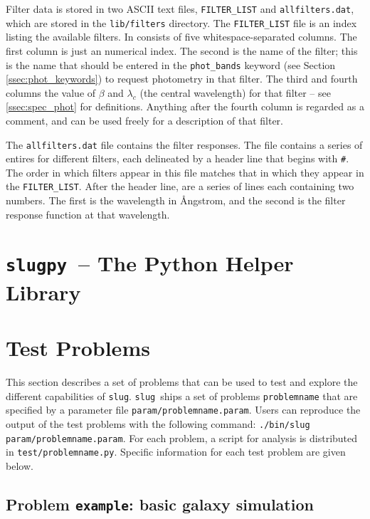 \documentclass[12pt]{article}
\newcommand{\slug}{\texttt{slug}}
\newcommand{\slugpy}{\texttt{slugpy}}
\begin{document}
Filter data is stored in two ASCII text files, \verb=FILTER_LIST= and \verb=allfilters.dat=, which are stored in the \verb=lib/filters= directory. The \verb=FILTER_LIST= file is an index listing the available filters. In consists of five whitespace-separated columns. The first column is just an numerical index. The second is the name of the filter; this is the name that should be entered in the \verb=phot_bands= keyword (see Section \ref{ssec:phot_keywords}) to request photometry in that filter. The third and fourth columns the value of $\beta$ and $\lambda_c$ (the central wavelength) for that filter -- see \ref{ssec:spec_phot} for definitions. Anything after the fourth column is regarded as a comment, and can be used freely for a description of that filter.

The \verb=allfilters.dat= file contains the filter responses. The file contains a series of entires for different filters, each delineated by a header line that begins with \verb=#=. The order in which filters appear in this file matches that in which they appear in the \verb=FILTER_LIST=. After the header line, are a series of lines each containing two numbers. The first is the wavelength in {\AA}ngstrom, and the second is the filter response function at that wavelength.

\section{\slugpy\ -- The Python Helper Library}



\section{Test Problems}
\label{sec:test}

This section describes a set of problems that can be used to test and explore the different 
capabilities of \slug. \slug\ ships a set of problems \verb=problemname= that are specified by a 
parameter file \verb=param/problemname.param=. Users can reproduce the output of the test 
problems with the following command: \verb=./bin/slug param/problemname.param=.
For each problem, a script for analysis is distributed in \verb=test/problemname.py=. 
Specific information for each test problem are given below. 

\subsection{Problem {\tt example}: basic galaxy simulation}
\end{document}
